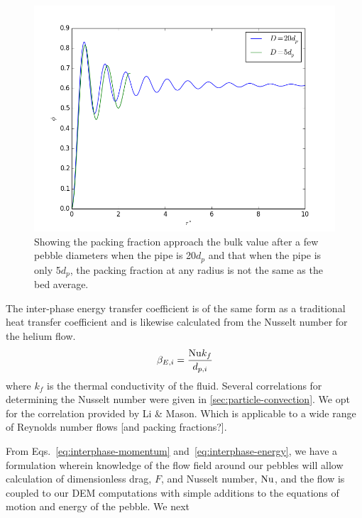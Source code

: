 \begin{figure}[htbp]
\begin{center}
	\includegraphics[width = \singleimagewidth]{chapters/figures/annular-packing-fraction.png}
	\caption{Showing the packing fraction approach the bulk value after a few pebble diameters when the pipe is 20$d_p$ and that when the pipe is only 5$d_p$, the packing fraction at any radius is not the same as the bed average.}
	\label{fig:packingDist}
\end{center}
\end{figure}
\FloatBarrier


The inter-phase energy transfer coefficient is of the same form as a traditional heat transfer coefficient and is likewise calculated from the Nusselt number for the helium flow.
\begin{equation}\label{eq:interphase-energy}
	\beta_{E,i} = \frac{\mathrm{Nu} k_f}{d_{p,i}}
\end{equation}
where $k_f$ is the thermal conductivity of the fluid. Several correlations for determining the Nusselt number were given in \cref{sec:particle-convection}. We opt for the correlation provided by Li \& Mason.\cite{Li2000} Which is applicable to a wide range of Reynolds number flows [and packing fractions?].

From Eqs.~\ref{eq:interphase-momentum} and~\ref{eq:interphase-energy}, we have a formulation wherein knowledge of the flow field around our pebbles will allow calculation of dimensionless drag, $F$, and Nusselt number, $\mathrm{Nu}$, and the flow is coupled to our DEM computations with simple additions to the equations of motion and energy of the pebble. We next 




